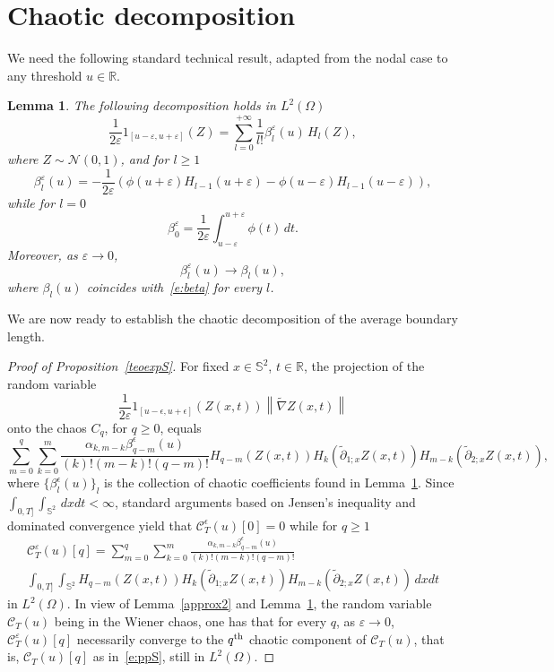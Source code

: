 \documentclass[10pt]{amsart}
\newtheorem{lemm}[theo]{Lemma}\newtheorem{prop}[theo]{Proposition}\newtheorem{coro}[theo]{Corollary}\newtheorem{conj}[theo]{Conjecture}
\theoremstyle{definition}\newtheorem{defi}[theo]{Definition}\newtheorem{rema}[theo]{Remark}\newtheorem{exam}[theo]{Example}\newtheorem{exem}[theo]{Example}\newtheorem{nota}[theo]{Notation}
\newcommand{\clC}{\mathcal{C}}
\newcommand{\clN}{\mathcal{N}}
\newcommand{\bbS}{\mathbb{S}}
\newcommand{\bbR}{\mathbb{R}}
\begin{document}
\section{Chaotic decomposition}\label{app-chaos}

We need the following standard technical result, adapted from the nodal case \cite{MPRW16} to any threshold $u\in \bbR$.

\begin{lemm}\label{indicator function}
The following decomposition holds in $L^2(\Omega)$
\begin{equation*}
\frac{1}{2\varepsilon}{1}_{[u-\varepsilon,u+\varepsilon]}(Z)=\sum_{l=0}^{+\infty }\frac{1}{l!}\beta_l^{\varepsilon}(u)\,H_{l}(Z),
\end{equation*}
where $Z\sim \clN(0,1)$, and for $l \geq 1$
\[
\beta_l^{\varepsilon}(u)=-\frac{1}{2\varepsilon}\left (
\phi \left (u+\varepsilon \right) H_{l-1} \left (u+\varepsilon \right)-
\phi \left (u-\varepsilon \right) H_{l-1} \left (u-\varepsilon \right) \right),
\]
while for $l=0$
\[
\beta_0^{\varepsilon} = \frac{1}{2\varepsilon} \int_{u-\varepsilon}^{u+\varepsilon} \phi(t)\,dt.
\]
Moreover, as $\varepsilon\to 0$,
\[
\beta_{l}^\varepsilon(u) \to \beta_l(u),
\]
where $\beta_l(u)$ coincides with~\eqref{e:beta} for every $l$.
\end{lemm}

We are now ready to establish the chaotic decomposition of the average boundary length.

\begin{proof}[Proof of Proposition~\ref{teoexpS}]
For fixed $x\in \bbS^2$, $t\in \bbR$, the projection of the random variable
\[
\frac{1}{2\varepsilon} 1_{[u-\epsilon, u+\epsilon]}(Z(x,t)) \left\|\widetilde \nabla Z(x,t)\right\|
\]
onto the chaos $C_{q}$, for $q\geq 0$, equals
\[
\sum_{m=0}^{q}\sum_{k=0}^{m} \frac{\alpha _{k,m-k}\beta^\epsilon _{q-m}(u)}{(k)!(m-k)!(q-m)!} H_{q-m}(Z(x,t))H_{k}\left(\widetilde\partial_{1;x} Z(x,t)\right)H_{m-k}\left(\widetilde{\partial}_{2;x} Z(x,t)\right),
\]
where $\{\beta_l^\epsilon(u)\}_l$ is the collection of chaotic coefficients found in Lemma~\ref{indicator function}. Since $\int_{0,T]}\int_{\bbS^2}\,dxdt<\infty$, standard arguments based on Jensen's inequality and dominated convergence yield that $\clC_T^\epsilon(u)[0] = 0$ while for $q\ge 1$
\begin{multline*}
\clC_T^{\varepsilon}(u)[q]= \sum_{m=0}^{q}\sum_{k=0}^{m} \frac{\alpha _{k,m-k}\beta^\epsilon _{q-m}(u)}{ (k)!(m-k)!(q-m)!} \\
\int_{0,T]}\int_{\bbS^2} H_{q-m}(Z(x,t))H_{k}\left(\widetilde\partial_{1;x} Z(x,t)\right)H_{m-k}\left(\widetilde{\partial} _{2;x} Z(x,t)\right)\,dx dt
\end{multline*}
in $L^2(\Omega)$. In view of Lemma~\ref{approx2} and Lemma~\ref{indicator function}, the random variable $\clC_T(u)$ being in the Wiener chaos, one has that for every $q$, as $\varepsilon \to 0$, $\clC_T^\varepsilon(u)[q]$ necessarily converge to the $q^{\rm th}$ chaotic component of $\clC_T(u)$, that is, $\clC_T(u)[q]$ as in~\eqref{e:ppS}, still in $L^2(\Omega)$.
\end{proof}
\end{document}

